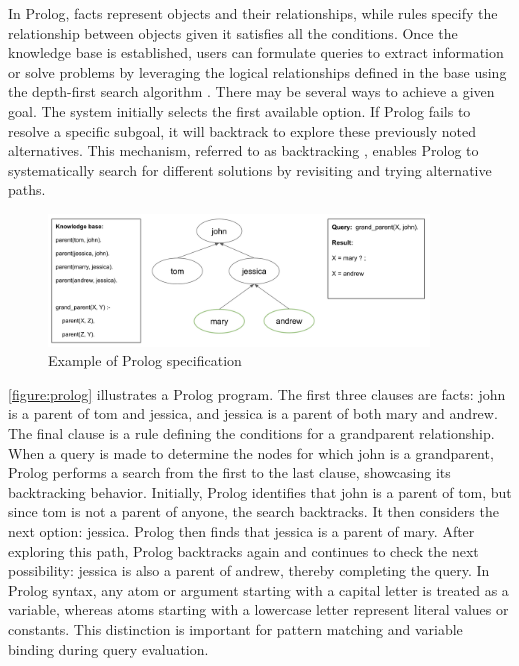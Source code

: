 In Prolog, facts represent objects and their relationships, while rules specify the relationship between objects given it satisfies all the conditions. Once the knowledge base is established, users can formulate queries to extract information or solve problems by leveraging the logical relationships defined in the base using the depth-first search algorithm \cite{Chowdhary2020}. There may be several ways to achieve a given goal. The system initially selects the first available option. If Prolog fails to resolve a specific subgoal, it will backtrack to explore these previously noted alternatives. This mechanism, referred to as backtracking \cite{Chowdhary2020}, enables Prolog to systematically search for different solutions by revisiting and trying alternative paths.

\begin{figure}[h]
    \centering
    \includegraphics[width=0.9\textwidth]{Packages/Prolog.png}
    \caption{Example of Prolog specification}
    \label{figure:prolog}
\end{figure}

\autoref{figure:prolog} illustrates a Prolog program. The first three clauses are facts: john is a parent of tom and jessica, and jessica is a parent of both mary and andrew. The final clause is a rule defining the conditions for a grandparent relationship. When a query is made to determine the nodes for which john is a grandparent, Prolog performs a search from the first to the last clause, showcasing its backtracking behavior. Initially, Prolog identifies that john is a parent of tom, but since tom is not a parent of anyone, the search backtracks. It then considers the next option: jessica. Prolog then finds that jessica is a parent of mary. After exploring this path, Prolog backtracks again and continues to check the next possibility: jessica is also a parent of andrew, thereby completing the query.
In Prolog syntax, any atom or argument starting with a capital letter is treated as a variable, whereas atoms starting with a lowercase letter represent literal values or constants. This distinction is important for pattern matching and variable binding during query evaluation.
